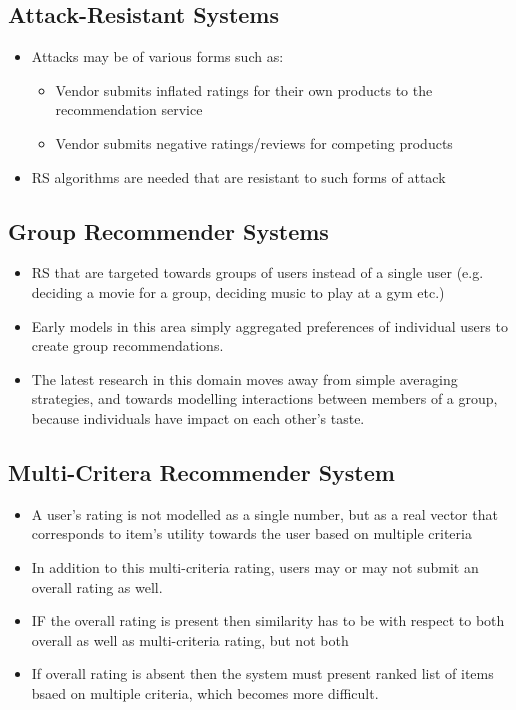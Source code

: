 \documentclass{article}
\begin{document}
\subsection{Attack-Resistant Systems}
\begin{itemize}
    \item Attacks may be of various forms such as:
    \begin{itemize}
        \item Vendor submits inflated ratings for their own products to the recommendation service
        
        \item Vendor submits negative ratings/reviews for competing products
    \end{itemize}
    
    \item RS algorithms are needed that are resistant to such forms of attack 
\end{itemize}

\subsection{Group Recommender Systems}
\begin{itemize}
    \item RS that are targeted towards groups of users instead of a single user (e.g. deciding a movie for a group, deciding music to play at a gym etc.)
    
    \item Early models in this area simply aggregated preferences of individual users to create group recommendations.
    
    \item The latest research in this domain moves away from simple averaging strategies, and towards modelling interactions between members of a group, because individuals have impact on each other's taste.
\end{itemize}

\subsection{Multi-Critera Recommender System}
\begin{itemize}
    \item A user's rating is not modelled as a single number, but as a real vector that corresponds to item's utility towards the user based on multiple criteria
    
    \item In addition to this multi-criteria rating, users may or may not submit an overall rating as well. 
    
    \item IF the overall rating is present then similarity has to be with respect to both overall as well as multi-criteria rating, but not both
    
    \item If overall rating is absent then the system must present ranked list of items bsaed on multiple criteria, which becomes more difficult. 
\end{itemize}
\end{document}
